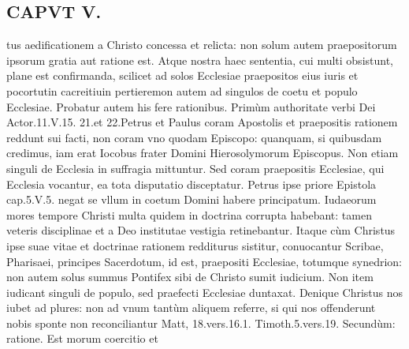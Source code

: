 \documentclass{article}
\begin{document}
\begin{pages}
\section*{CAPVT V. }
\marginpar{[ p.245 ]}\pstart tus aedificationem a Christo concessa et relicta: non solum autem praepositorum ipsorum gratia aut ratione est. Atque nostra haec sententia, cui multi obsistunt, plane est confirmanda, scilicet ad solos Ecclesiae praepositos eius iuris et pocortutin cacreitiuin pertieremon autem ad singulos de coetu et populo Ecclesiae. Probatur autem his fere rationibus.  \pend\pstart Primùm authoritate verbi Dei Actor.11.V.15. 21.et 22.Petrus et Paulus coram Apostolis et praepositis rationem reddunt sui facti, non coram vno quodam Episcopo: quanquam, si quibusdam credimus, iam erat Iocobus frater Domini Hierosolymorum Episcopus. Non etiam singuli de Ecclesia in suffragia mittuntur. Sed coram praepositis Ecclesiae, qui Ecclesia vocantur, ea tota disputatio disceptatur. Petrus ipse priore Epistola cap.5.V.5. negat se vllum in coetum Domini habere principatum. Iudaeorum mores tempore Christi multa quidem in doctrina corrupta habebant: tamen veteris disciplinae et a Deo institutae vestigia retinebantur. Itaque cùm Christus ipse suae vitae et doctrinae rationem redditurus sistitur, conuocantur Scribae, Pharisaei, principes Sacerdotum, id est, praepositi Ecclesiae, totumque synedrion: non autem solus summus Pontifex sibi de Christo sumit iudicium. Non item iudicant singuli de populo, sed praefecti Ecclesiae duntaxat. Denique Christus nos iubet ad plures: non ad vnum tantùm aliquem referre, si qui nos offenderunt nobis sponte non reconciliantur Matt, 18.vers.16.1. Timoth.5.vers.19.  \pend\pstart Secundùm: ratione. Est morum coercitio et  \pend

\end{pages}
\end{document}
